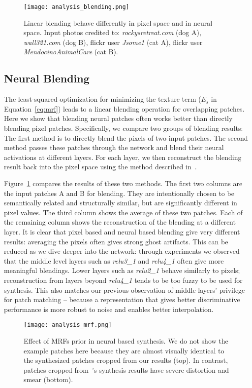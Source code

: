 \documentclass[10pt,twocolumn,letterpaper]{article}
\begin{document}
\begin{figure}[t]
	\centering
	\texttt{[image: analysis\_blending.png]}
	\caption{Linear blending behave differently in pixel space and in neural space. Input photos credited to: \emph{rockysretreat.com} (dog A), \emph{wall321.com} (dog B), flickr user \emph{Jsome1} (cat A), flickr user \emph{MendocinoAnimalCare} (cat B).}\label{fig:analysis_blending}
\end{figure}

\subsection{Neural Blending}
The least-squared optimization for minimizing the texture term ($E_{s}$ in Equation~\ref{eq:mrf}) leads to a linear blending operation for overlapping patches. Here we show that blending neural patches often works better than directly blending pixel patches. Specifically, we compare two groups of blending results: The first method is to directly blend the pixels of two input patches. The second method passes these patches through the network and blend their neural activations at different layers. For each layer, we then reconstruct the blending result back into the pixel space using the method described in~\cite{Mahendran15}.

Figure~\ref{fig:analysis_blending} compares the results of these two methods. The first two columns are the input patches A and B for blending. They are intentionally chosen to be semantically related and structurally similar, but are significantly different in pixel values. The third column shows the average of these two patches. Each of the remaining column shows the reconstruction of the blending at a different layer. It is clear that pixel based and neural based blending give very different results: averaging the pixels often gives strong ghost artifacts. This can be reduced as we dive deeper into the network: through experiments we observed that the middle level layers such as \textit{relu3\_1} and \textit{relu4\_1} often give more meaningful blendings. Lower layers such as \textit{relu2\_1} behave similarly to pixels; reconstruction from layers beyond \textit{relu4\_1} tends to be too fuzzy to be used for synthesis. This also matches our previous observation of middle layers' privilege for patch matching -- because a representation that gives better discriminative performance is more robust to noise and enables better interpolation.

\begin{figure}[t]
	\centering
	\texttt{[image: analysis\_mrf.png]}
	\caption{Effect of MRFs prior in neural based synthesis. We do not show the example patches here because they are almost visually identical to the synthesized patches cropped from our results (top). In contrast, patches cropped from~\cite{Gatys15}'s synthesis results have severe distortion and smear (bottom).}\label{fig:analysis_mrf}
\end{figure}
\end{document}

